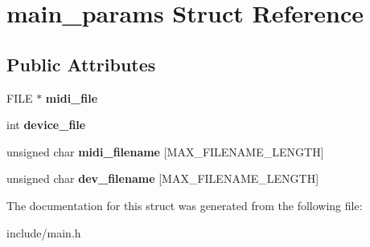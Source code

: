 \hypertarget{structmain__params}{}\section{main\+\_\+params Struct Reference}
\label{structmain__params}
\subsection*{Public Attributes}
\begin{DoxyCompactItemize}
\item 
\mbox{\label{structmain__params_a9eaa26f263d87cc4b8d0de019e7d7aa0}} 
F\+I\+LE $\ast$ {\bfseries midi\+\_\+file}
\item 
\mbox{\label{structmain__params_ad559aa0a7e7de590fb105fb64e79237d}} 
int {\bfseries device\+\_\+file}
\item 
\mbox{\label{structmain__params_a482ba5c11ddb6f78c6f6f3be208c8170}} 
unsigned char {\bfseries midi\+\_\+filename} \mbox{[}M\+A\+X\+\_\+\+F\+I\+L\+E\+N\+A\+M\+E\+\_\+\+L\+E\+N\+G\+TH\mbox{]}
\item 
\mbox{\label{structmain__params_a3b6c5f112323449efd519ce7eef29bcd}} 
unsigned char {\bfseries dev\+\_\+filename} \mbox{[}M\+A\+X\+\_\+\+F\+I\+L\+E\+N\+A\+M\+E\+\_\+\+L\+E\+N\+G\+TH\mbox{]}
\end{DoxyCompactItemize}


The documentation for this struct was generated from the following file\+:\begin{DoxyCompactItemize}
\item 
include/main.\+h\end{DoxyCompactItemize}
